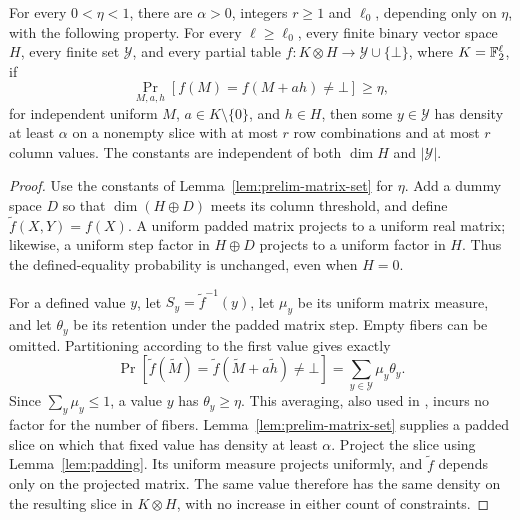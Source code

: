\begin{theorem}
\label{thm:inverse}
For every $0<\eta<1$, there are $\alpha>0$, integers $r\geq1$ and
$\ell_0$, depending only on $\eta$, with the following property.
For every $\ell\geq\ell_0$, every finite binary vector space $H$,
every finite set $\mathcal Y$, and every partial table
$f:K\otimes H\to\mathcal Y\cup\{\bot\}$, where $K=\mathbb F_2^\ell$,
if
\begin{equation}
 \Pr_{M,a,h}[f(M)=f(M+ah)\ne\bot]\geq\eta,
 \label{eq:prelim-defined-equality}
\end{equation}
for independent uniform $M$, $a\in K\setminus\{0\}$, and $h\in H$,
then some $y\in\mathcal Y$ has density at least $\alpha$ on a
nonempty slice with at most $r$ row combinations and at most $r$
column values.  The constants are independent of both $\dim H$ and
$|\mathcal Y|$.
\end{theorem}

\begin{proof}
Use the constants of Lemma~\ref{lem:prelim-matrix-set} for $\eta$.
Add a dummy space $D$ so that $\dim(H\oplus D)$ meets its column
threshold, and define $\widetilde f(X,Y)=f(X)$.  A uniform padded
matrix projects to a uniform real matrix; likewise, a uniform step
factor in $H\oplus D$ projects to a uniform factor in $H$.
Thus the defined-equality probability is unchanged, even when $H=0$.

For a defined value $y$, let $S_y=\widetilde f^{-1}(y)$, let
$\mu_y$ be its uniform matrix measure, and let $\theta_y$ be its
retention under the padded matrix step.  Empty fibers can be omitted.
Partitioning according to the first value gives exactly
\begin{equation}
 \Pr[\widetilde f(\widetilde M)
       =\widetilde f(\widetilde M+a\widetilde h)\ne\bot]
 =\sum_{y\in\mathcal Y}\mu_y\theta_y.
 \label{eq:prelim-fiber-average}
\end{equation}
Since $\sum_y\mu_y\leq1$, a value $y$ has $\theta_y\geq\eta$.
This averaging, also used in
\cite[Lemma~2.3]{BarakKothariSteurer2018}, incurs no factor for
the number of fibers.  Lemma~\ref{lem:prelim-matrix-set} supplies a
padded slice on which that fixed value has density at least $\alpha$.
Project the slice using Lemma~\ref{lem:padding}.  Its uniform measure
projects uniformly, and $\widetilde f$ depends only on the projected
matrix.  The same value therefore has the same density on the
resulting slice in $K\otimes H$, with no increase in either count of
constraints.
\end{proof}

